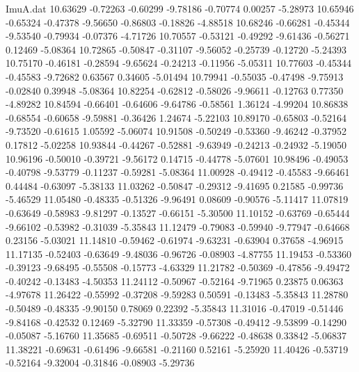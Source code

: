 \begin{filecontents}{ImuA.dat}
  10.63629   -0.72263   -0.60299   -9.78186   -0.70774    0.00257   -5.28973
  10.65946   -0.65324   -0.47378   -9.56650   -0.86803   -0.18826   -4.88518
  10.68246   -0.66281   -0.45344   -9.53540   -0.79934   -0.07376   -4.71726
  10.70557   -0.53121   -0.49292   -9.61436   -0.56271    0.12469   -5.08364
  10.72865   -0.50847   -0.31107   -9.56052   -0.25739   -0.12720   -5.24393
  10.75170   -0.46181   -0.28594   -9.65624   -0.24213   -0.11956   -5.05311
  10.77603   -0.45344   -0.45583   -9.72682    0.63567    0.34605   -5.01494
  10.79941   -0.55035   -0.47498   -9.75913   -0.02840    0.39948   -5.08364
  10.82254   -0.62812   -0.58026   -9.96611   -0.12763    0.77350   -4.89282
  10.84594   -0.66401   -0.64606   -9.64786   -0.58561    1.36124   -4.99204
  10.86838   -0.68554   -0.60658   -9.59881   -0.36426    1.24674   -5.22103
  10.89170   -0.65803   -0.52164   -9.73520   -0.61615    1.05592   -5.06074
  10.91508   -0.50249   -0.53360   -9.46242   -0.37952    0.17812   -5.02258
  10.93844   -0.44267   -0.52881   -9.63949   -0.24213   -0.24932   -5.19050
  10.96196   -0.50010   -0.39721   -9.56172    0.14715   -0.44778   -5.07601
  10.98496   -0.49053   -0.40798   -9.53779   -0.11237   -0.59281   -5.08364
  11.00928   -0.49412   -0.45583   -9.66461    0.44484   -0.63097   -5.38133
  11.03262   -0.50847   -0.29312   -9.41695    0.21585   -0.99736   -5.46529
  11.05480   -0.48335   -0.51326   -9.96491    0.08609   -0.90576   -5.11417
  11.07819   -0.63649   -0.58983   -9.81297   -0.13527   -0.66151   -5.30500
  11.10152   -0.63769   -0.65444   -9.66102   -0.53982   -0.31039   -5.35843
  11.12479   -0.79083   -0.59940   -9.77947   -0.64668    0.23156   -5.03021
  11.14810   -0.59462   -0.61974   -9.63231   -0.63904    0.37658   -4.96915
  11.17135   -0.52403   -0.63649   -9.48036   -0.96726   -0.08903   -4.87755
  11.19453   -0.53360   -0.39123   -9.68495   -0.55508   -0.15773   -4.63329
  11.21782   -0.50369   -0.47856   -9.49472   -0.40242   -0.13483   -4.50353
  11.24112   -0.50967   -0.52164   -9.71965    0.23875    0.06363   -4.97678
  11.26422   -0.55992   -0.37208   -9.59283    0.50591   -0.13483   -5.35843
  11.28780   -0.50489   -0.48335   -9.90150    0.78069    0.22392   -5.35843
  11.31016   -0.47019   -0.51446   -9.84168   -0.42532    0.12469   -5.32790
  11.33359   -0.57308   -0.49412   -9.53899   -0.14290   -0.05087   -5.16760
  11.35685   -0.69511   -0.50728   -9.66222   -0.48638    0.33842   -5.06837
  11.38221   -0.69631   -0.61496   -9.66581   -0.21160    0.52161   -5.25920
  11.40426   -0.53719   -0.52164   -9.32004   -0.31846   -0.08903   -5.29736

\end{filecontents}
